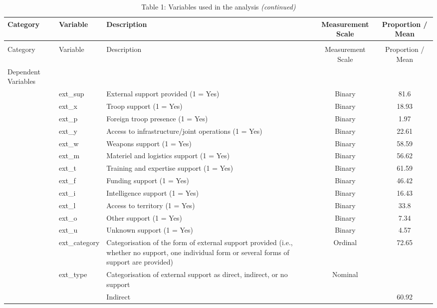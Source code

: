 \documentclass[
]{article}
\begin{document}
\begin{landscape}
\begingroup\fontsize{7}{9}\selectfont

\begin{longtable}[t]{ll>{\raggedright\arraybackslash}p{6cm}cc}
\caption{\label{tab:Table 1: Variable Table}Table 1: Variables used in the analysis}\\
\toprule
Category & Variable & Description & Measurement Scale & Proportion / Mean\\
\midrule
\endfirsthead
\caption[]{Table 1: Variables used in the analysis \textit{(continued)}}\\
\toprule
Category & Variable & Description & Measurement Scale & Proportion / Mean\\
\midrule
\endhead

\endfoot
\bottomrule
\endlastfoot
Dependent Variables &  &  &  & \\
 & ext\_sup & External support provided (1 = Yes) & Binary & 81.6\\
 & ext\_x & Troop support (1 = Yes) & Binary & 18.93\\
 & ext\_p & Foreign troop presence (1 = Yes) & Binary & 1.97\\
 & ext\_y & Access to infrastructure/joint operations (1 = Yes) & Binary & 22.61\\
\addlinespace
 & ext\_w & Weapons support (1 = Yes) & Binary & 58.59\\
 & ext\_m & Materiel and logistics support (1 = Yes) & Binary & 56.62\\
 & ext\_t & Training and expertise support (1 = Yes) & Binary & 61.59\\
 & ext\_f & Funding support (1 = Yes) & Binary & 46.42\\
 & ext\_i & Intelligence support (1 = Yes) & Binary & 16.43\\
\addlinespace
 & ext\_l & Access to territory (1 = Yes) & Binary & 33.8\\
 & ext\_o & Other support (1 = Yes) & Binary & 7.34\\
 & ext\_u & Unknown support (1 = Yes) & Binary & 4.57\\
 & ext\_category & Categorisation of the form of external support provided (i.e.,  whether no support, one individual form or several forms of support are provided) & Ordinal & 72.65\\
 & ext\_type & Categorisation of external support as direct, indirect, or no support & Nominal & \\
\addlinespace
 &  & Indirect &  & 60.92\\

\end{longtable}
\end{landscape}
\end{document}
